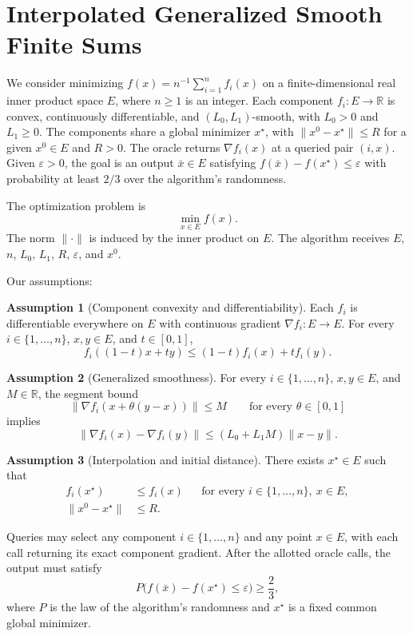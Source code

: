 \documentclass[10pt]{article}
\theoremstyle{definition}
\newtheorem{assumption}{Assumption}
\begin{document}
\section*{Interpolated Generalized Smooth Finite Sums}
We consider minimizing $f(x)=n^{-1}\sum_{i=1}^n f_i(x)$ on a finite-dimensional real inner product space $E$, where $n\geq1$ is an integer. Each component $f_i:E\to\mathbb{R}$ is convex, continuously differentiable, and $(L_0,L_1)$-smooth, with $L_0>0$ and $L_1\geq0$. The components share a global minimizer $x^\star$, with $\|x^0-x^\star\|\leq R$ for a given $x^0\in E$ and $R>0$. The oracle returns $\nabla f_i(x)$ at a queried pair $(i,x)$. Given $\varepsilon>0$, the goal is an output $\bar{x}\in E$ satisfying $f(\bar{x})-f(x^\star)\leq\varepsilon$ with probability at least $2/3$ over the algorithm's randomness.

The optimization problem is
\[
\min_{x\in E} f(x).
\]
The norm $\|\cdot\|$ is induced by the inner product on $E$. The algorithm receives $E$, $n$, $L_0$, $L_1$, $R$, $\varepsilon$, and $x^0$.

Our assumptions:
\begin{assumption}[Component convexity and differentiability]
Each $f_i$ is differentiable everywhere on $E$ with continuous gradient $\nabla f_i:E\to E$. For every $i\in\{1,\ldots,n\}$, $x,y\in E$, and $t\in[0,1]$,
\[
f_i((1-t)x+ty)\leq (1-t)f_i(x)+t f_i(y).
\]
\end{assumption}

\begin{assumption}[Generalized smoothness]
For every $i\in\{1,\ldots,n\}$, $x,y\in E$, and $M\in\mathbb{R}$, the segment bound
\[
\|\nabla f_i(x+\theta(y-x))\|\leq M
\qquad\text{for every }\theta\in[0,1]
\]
implies
\[
\|\nabla f_i(x)-\nabla f_i(y)\|
\leq (L_0+L_1M)\|x-y\|.
\]
\end{assumption}

\begin{assumption}[Interpolation and initial distance]
There exists $x^\star\in E$ such that
\[
\begin{aligned}
f_i(x^\star)&\leq f_i(x)
&&\text{for every }i\in\{1,\ldots,n\},\ x\in E,\\
\|x^0-x^\star\|&\leq R.
\end{aligned}
\]
\end{assumption}

Queries may select any component $i\in\{1,\ldots,n\}$ and any point $x\in E$, with each call returning its exact component gradient. After the allotted oracle calls, the output must satisfy
\[
P\bigl(f(\bar{x})-f(x^\star)\leq\varepsilon\bigr)
\geq \frac{2}{3},
\]
where $P$ is the law of the algorithm's randomness and $x^\star$ is a fixed common global minimizer.
\end{document}
